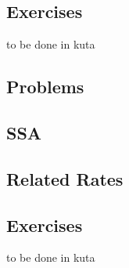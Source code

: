 \subsection{Exercises}
to be done in kuta

\newpage
{}
\subsection{Problems}
\noindent{}
\newpage
\subsection{SSA}
\subsection{Related Rates}
\subsection{Exercises}
to be done in kuta


